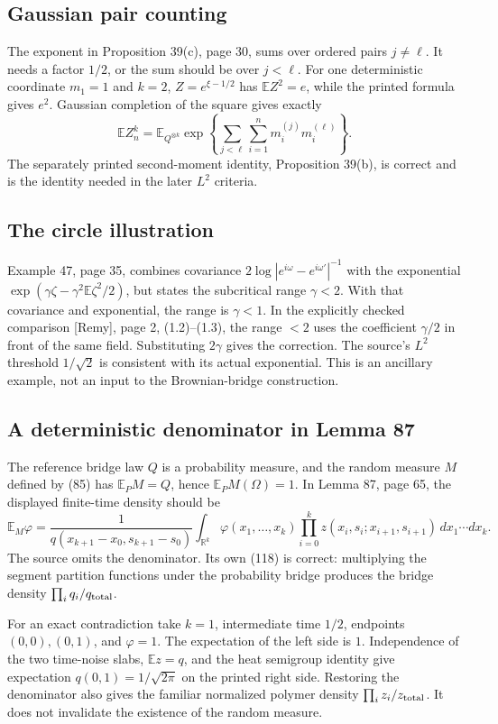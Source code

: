 \documentclass[10pt]{article}
\begin{document}
\subsection*{Gaussian pair counting}
The exponent in Proposition 39(c), page 30, sums over ordered pairs \(j\ne\ell\). It needs a factor \(1/2\), or the sum should be over \(j<\ell\). For one deterministic coordinate \(m_1=1\) and \(k=2\), \(Z=e^{\xi-1/2}\) has \(\mathbb EZ^2=e\), while the printed formula gives \(e^2\). Gaussian completion of the square gives exactly \[\mathbb EZ_n^k=
 \mathbb E_{Q^{\otimes k}}
 \exp\left\{\sum_{j<\ell}\sum_{i=1}^n m_i^{(j)}m_i^{(\ell)}\right\}.\] The separately printed second-moment identity, Proposition 39(b), is correct and is the identity needed in the later \(L^2\) criteria.\par
\subsection*{The circle illustration}
Example 47, page 35, combines covariance \(2\log|e^{i\omega}-e^{i\omega'}|^{-1}\) with the exponential \(\exp(\gamma\zeta-\gamma^2\mathbb E\zeta^2/2)\), but states the subcritical range \(\gamma<2\). With that covariance and exponential, the range is \(\gamma<1\). In the explicitly checked comparison [Remy], page 2, (1.2)–(1.3), the range \(<2\) uses the coefficient \(\gamma/2\) in front of the same field. Substituting \(2\gamma\) gives the correction. The source’s \(L^2\) threshold \(1/\sqrt2\) is consistent with its actual exponential. This is an ancillary example, not an input to the Brownian-bridge construction.\par
\subsection*{A deterministic denominator in Lemma 87}
The reference bridge law \(Q\) is a probability measure, and the random measure \(M\) defined by (85) has \(\mathbb E_P M=Q\), hence \(\mathbb E_P M(\Omega)=1\). In Lemma 87, page 65, the displayed finite-time density should be \[\mathbb E_M\varphi
 =\frac{1}{q(x_{k+1}-x_0,s_{k+1}-s_0)}
 \int_{\mathbb R^k}\varphi(x_1,\ldots,x_k)
 \prod_{i=0}^k z(x_i,s_i;x_{i+1},s_{i+1})\,dx_1\cdots dx_k .\] The source omits the denominator. Its own (118) is correct: multiplying the segment partition functions under the probability bridge produces the bridge density \(\prod_i q_i/q_{\rm total}\).\par
For an exact contradiction take \(k=1\), intermediate time \(1/2\), endpoints \((0,0),(0,1)\), and \(\varphi=1\). The expectation of the left side is \(1\). Independence of the two time-noise slabs, \(\mathbb Ez=q\), and the heat semigroup identity give expectation \(q(0,1)=1/\sqrt{2\pi}\) on the printed right side. Restoring the denominator also gives the familiar normalized polymer density \(\prod_i z_i/z_{\rm total}\). It does not invalidate the existence of the random measure.\par
\end{document}
